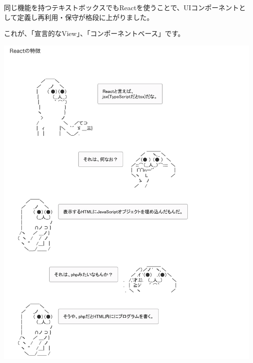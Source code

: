 同じ機能を持つテキストボックスでもReactを使うことで、UIコンポーネントとして定義し再利用・保守が格段に上がりました。

\vspace*{\baselineskip}

これが、「宣言的なView」、「コンポーネントベース」です。

\begin{reviewimage}[H]%
\includegraphics[width=0.9\maxwidth]{./images/03-todo-with-react/jsx01.png}%
\label{image:03-todo-with-react:jsx01}
\end{reviewimage}
